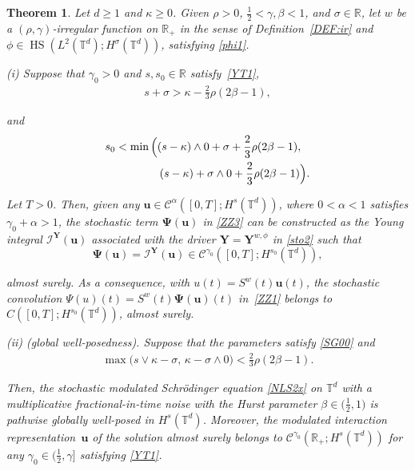 \documentclass[letterpaper, 11pt,  reqno]{amsart}
\newtheorem{theorem}{Theorem} [section]
\DeclareMathOperator{\HS}{HS}
\newcommand{\1}{\hspace{0.5mm}\textup{I}\hspace{0.5mm}}
\newcommand{\I}{\mathcal{I}}
\newcommand{\noi}{\noindent}
\newcommand{\R}{\mathbb{R}}
\newcommand{\T}{\mathbb{T}}
\newcommand{\CC}{\mathcal{C}}
\newcommand{\al}{\alpha}
\newcommand{\be}{\beta}
\newcommand{\kk}{\kappa}
\newcommand{\g}{\gamma}
\newcommand{\s}{\sigma}
\newcommand{\sw}{S^w}
\newcommand{\uu}{\mathbf{u}}
\newcommand{\PPsi}{\pmb{\Psi}}
\newcommand{\YY}{\mathbf{Y}}
\numberwithin{equation}{section}
\numberwithin{theorem}{section}
\begin{document}
\begin{theorem}
\label{THM:NLS}
Let 
$d\ge 1$ and $\kk \ge 0$.
Given 
$\rho > 0$, 
$\frac 12 < \g, \be < 1$, and $ \s \in \R$, 
let 
$w$ be 
 a $(\rho,\g)$-irregular function on $\R_+$ in the sense of Definition~\ref{DEF:ir}
 and 
$\phi \in \HS(L^2(\T^d); H^\s(\T^d))$, satisfying
\eqref{phi1}.



\medskip

\noi
{\rm (i)}
Suppose that 
$  \g_0 > 0 $ and $s, s_0 \in \R$ satisfy~\eqref{YT1}, 
\begin{align}
s + \s > \kk -  \frac 23  \rho (2\be -1 ), 
\label{SG00}
\end{align}

\noi
and
\begin{align}
\begin{split}
s_0 & < \min\Big( (s-\kk)\wedge 0 + \s  + \frac 23 \rho(2\be -1), \\
& \hphantom{XXXXi} 
(s-\kk)+ \s \wedge 0 + \frac 23 \rho(2\be -1)\Big).
\end{split}
\label{SG0a}
\end{align}



\noi
Let $T > 0$.
Then, given any $\uu \in \CC^\al([0, T]; H^s(\T^d))$, 
where
 $0 < \al < 1$ satisfies
$\g_0 + \al > 1$, 
the stochastic term $\PPsi (\uu)$ in \eqref{ZZ3} can be constructed as 
the Young integral
$\I^\YY(\uu)$ 
associated with the driver $\YY = \YY^{w, \phi}$ in \eqref{sto2}
such that 
\[\PPsi(\uu) = \I^\YY(\uu)
 \in \CC^{\g_0}([0, T]; H^{s_0}(\T^d)),\] 

\noi
almost surely.
 As a  consequence, with $u(t) = \sw(t)\uu(t)$, 
 the stochastic convolution $\Psi(u)(t) = \sw(t)\PPsi(\uu)(t)$
 in~\eqref{ZZ1}
belongs to 
$C([0, T]; H^{s_0}(\T^d))$, almost surely.



\medskip

\noi
{\rm (ii)
 (global well-posedness).}
Suppose that
the parameters satisfy
\eqref{SG00} and
\begin{align}
\max\Big( s\vee \kk - \s, \, \kk- \s \wedge 0 \Big)
< \frac 23 \rho(2\be - 1).
\label{SG0b}
\end{align}

\noi
Then, the stochastic modulated Schr\"odinger equation \eqref{NLS2x}
on  $\T^d$
with a multiplicative fractional-in-time noise 
with the Hurst parameter $\be \in \big(\frac 12 , 1\big)$
is pathwise globally well-posed in $H^s(\T^d)$.
Moreover, the modulated interaction representation~$\uu$
of the solution almost surely belongs
to $\CC^{ \g_0}(\R_+; H^s(\T^d))$
for any $ \g_0 \in \big(\frac 12 ,  \g\big] $ satisfying \eqref{YT1}.







\end{theorem}
\end{document}
